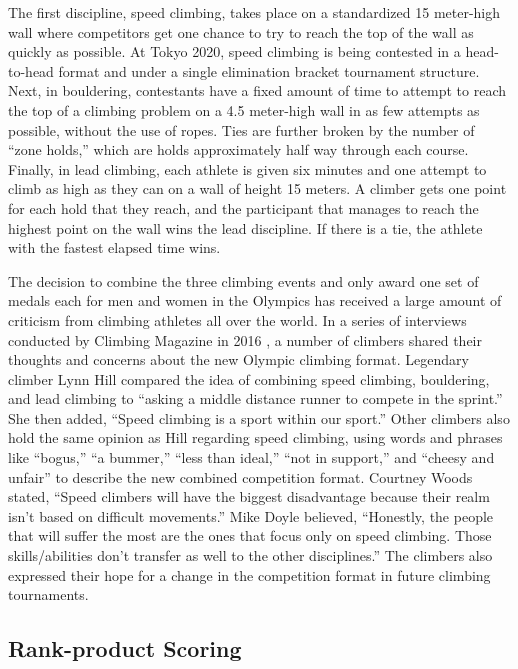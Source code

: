\documentclass[letterpaper, inpress]{jds} %
\begin{document}
The first discipline, speed climbing, takes place on a standardized 15
meter-high wall where competitors get one chance to try to reach the top
of the wall as quickly as possible. At Tokyo 2020, speed climbing is
being contested in a head-to-head format and under a single elimination
bracket tournament structure. Next, in bouldering, contestants have a
fixed amount of time to attempt to reach the top of a climbing problem
on a 4.5 meter-high wall in as few attempts as possible, without the use
of ropes. Ties are further broken by the number of ``zone holds,'' which
are holds approximately half way through each course. Finally, in lead
climbing, each athlete is given six minutes and one attempt to climb as
high as they can on a wall of height 15 meters. A climber gets one point
for each hold that they reach, and the participant that manages to reach
the highest point on the wall wins the lead discipline. If there is a
tie, the athlete with the fastest elapsed time wins.

The decision to combine the three climbing events and only award one set
of medals each for men and women in the Olympics has received a large
amount of criticism from climbing athletes all over the world. In a
series of interviews conducted by Climbing Magazine in 2016 \citep{blanchard2016}, a number of climbers shared their thoughts and concerns about the
new Olympic climbing format. Legendary climber Lynn Hill compared the
idea of combining speed climbing, bouldering, and lead climbing to
``asking a middle distance runner to compete in the sprint.'' She then
added, ``Speed climbing is a sport within our sport.'' Other climbers
also hold the same opinion as Hill regarding speed climbing, using words
and phrases like ``bogus,'' ``a bummer,'' ``less than ideal,'' ``not in
support,'' and ``cheesy and unfair'' to describe the new combined
competition format. Courtney Woods stated, ``Speed climbers will have
the biggest disadvantage because their realm isn't based on difficult
movements.'' Mike Doyle believed, ``Honestly, the people that will
suffer the most are the ones that focus only on speed climbing. Those
skills/abilities don't transfer as well to the other disciplines.'' The
climbers also expressed their hope for a change in the competition
format in future climbing tournaments.

\subsection{Rank-product Scoring}
\label{rank-product-scoring}
\end{document}
